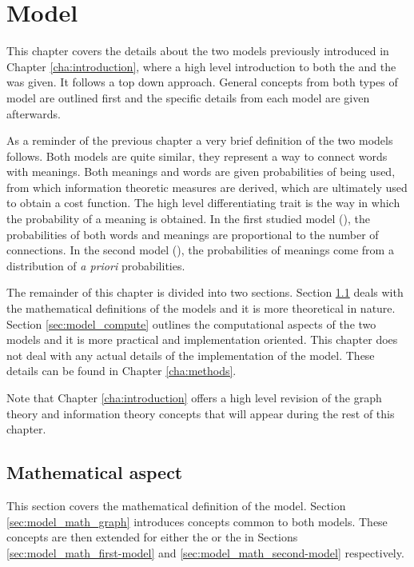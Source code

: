 \chapter{Model}
\label{cha:model}

This chapter covers the details about the two models previously introduced in Chapter \ref{cha:introduction}, where a high level introduction to both the \firstmodel{} and the \secondmodel{} was given.
It follows a top down approach.
General concepts from both types of model are outlined first and the specific details from each model are given afterwards.

As a reminder of the previous chapter a very brief definition of the two models follows.
Both models are quite similar, they represent a way to connect words with meanings.
Both meanings and words are given probabilities of being used, from which information theoretic measures are derived, which are ultimately used to obtain a cost function.
The high level differentiating trait is the way in which the probability of a meaning is obtained.
In the first studied model (\firstmodel{}), the probabilities of both words and meanings are proportional to the number of connections.
In the second model (\secondmodel{}), the probabilities of meanings come from a distribution of \emph{a priori} probabilities.

The remainder of this chapter is divided into two sections.
Section \ref{sec:model_math} deals with the mathematical definitions of the models and it is more theoretical in nature.
Section \ref{sec:model_compute} outlines the computational aspects of the two models and it is more practical and implementation oriented.
This chapter does not deal with any actual details of the implementation of the model.
These details can be found in Chapter \ref{cha:methods}.

Note that Chapter \ref{cha:introduction} offers a high level revision of the graph theory and information theory concepts that will appear during the rest of this chapter.

\section{Mathematical aspect}
\label{sec:model_math}

This section covers the mathematical definition of the model.
Section \ref{sec:model_math_graph} introduces concepts common to both models.
These concepts are then extended for either the \firstmodel{} or the \secondmodel{} in Sections \ref{sec:model_math_first-model} and \ref{sec:model_math_second-model} respectively.

